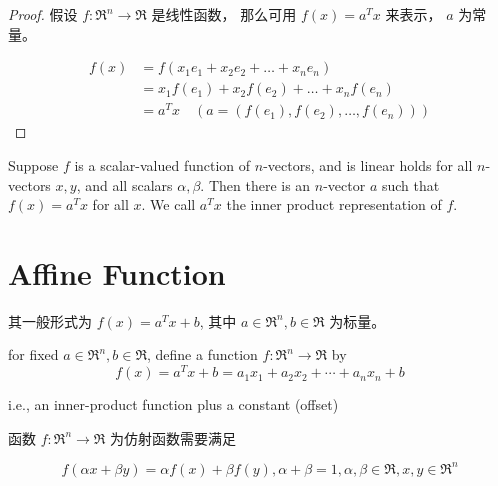 \begin{proof}
    假设 $ f: \mathfrak{R}^{n} \rightarrow \mathfrak{R} $ 是线性函数， 那么可用 $ f(x)=a^{T} x $ 来表示， $ a $ 为常量。

    \begin{equation} \begin{aligned} f(x) &=f\left(x_{1} e_{1}+x_{2} e_{2}+\ldots+x_{n} e_{n}\right) \\ &=x_{1} f\left(e_{1}\right)+x_{2} f\left(e_{2}\right)+\ldots+x_{n} f\left(e_{n}\right) \\ & = a^Tx \quad (a = ( f\left(e_{1}\right), f\left(e_{2}\right), \ldots, f\left(e_{n}\right) )) \end{aligned} \end{equation}
\end{proof}

\begin{definition}
    Suppose $ f $ is a scalar-valued function of $ n $-vectors, and is linear  holds for all $ n $-vectors $ x, y $, and all scalars $ \alpha, \beta $. Then there is an $ n $-vector $ a $ such that $ f(x)=a^{T} x $ for all $ x $. We call $ a^{T} x $ the inner product representation of $ f $.
\end{definition}

\section{Affine Function}


\begin{definition}
    其一般形式为 $ f(x)=a^{T} x+{b} $, 其中 $ a \in \mathfrak{R}^{n}, b \in \mathfrak{R} $ 为标量。 

    
        for fixed $ a \in \mathfrak{R}^{n}, b \in \mathfrak{R} $, define a function $ f: \mathfrak{R}^{n} \rightarrow \mathfrak{R} $ by
    \begin{equation}
    f(x)=a^{T} x+b=a_{1} x_{1}+a_{2} x_{2}+\cdots+a_{n} x_{n}+b
    \end{equation}
    
    i.e., an inner-product function plus a constant (offset)
    
\end{definition}

\begin{theorem}
    函数 $ f: \mathfrak{R}^{n} \rightarrow \mathfrak{R} $ 为仿射函数需要满足

\begin{equation} f(\alpha x+\beta y)=\alpha f(x)+\beta f(y), \alpha+\beta=1, \alpha, \beta \in \mathfrak{R}, x, y \in \mathfrak{R}^{n} \end{equation}
\end{theorem}

